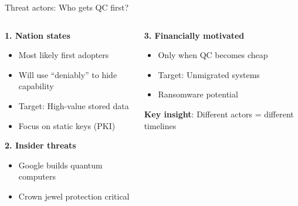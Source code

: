 \documentclass[aspectratio=169, lualatex, handout]{beamer}
\begin{document}
\begin{frame}{Threat actors: Who gets QC first?}
	\begin{columns}[c]
		\begin{column}{0.55\textwidth}
			\textbf{1. Nation states}
			\begin{itemize}
				\item Most likely first adopters
				\item Will use ``deniably'' to hide capability
				\item Target: High-value stored data
				\item Focus on static keys (PKI)
			\end{itemize}
			\textbf{2. Insider threats}
			\begin{itemize}
				\item Google builds quantum computers
				\item Crown jewel protection critical
			\end{itemize}
		\end{column}
		\begin{column}{0.45\textwidth}
			\textbf{3. Financially motivated}
			\begin{itemize}
				\item Only when QC becomes cheap
				\item Target: Unmigrated systems
				\item Ransomware potential
			\end{itemize}
			\vspace{5mm}
			\textbf{Key insight}: Different actors = different timelines
		\end{column}
	\end{columns}
\end{frame}
\end{document}
